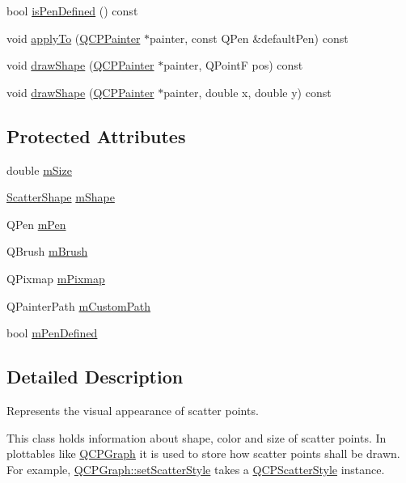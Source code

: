 \begin{DoxyCompactItemize}
bool \hyperlink{class_q_c_p_scatter_style_a7f1385a8d5e4f349a6b8030723fbd0f7}{is\+Pen\+Defined} () const 
\item 
void \hyperlink{class_q_c_p_scatter_style_a81817dfd404635f211e6ff2a04657d36}{apply\+To} (\hyperlink{class_q_c_p_painter}{Q\+C\+P\+Painter} $\ast$painter, const Q\+Pen \&default\+Pen) const 
\item 
void \hyperlink{class_q_c_p_scatter_style_a992d531ac471ec2b29bdec6aeb400a06}{draw\+Shape} (\hyperlink{class_q_c_p_painter}{Q\+C\+P\+Painter} $\ast$painter, Q\+Point\+F pos) const 
\item 
void \hyperlink{class_q_c_p_scatter_style_ae76811ac9f70ebf7a2b4c759853e6ed8}{draw\+Shape} (\hyperlink{class_q_c_p_painter}{Q\+C\+P\+Painter} $\ast$painter, double x, double y) const 
\end{DoxyCompactItemize}
\subsection*{Protected Attributes}
\begin{DoxyCompactItemize}
\item 
double \hyperlink{class_q_c_p_scatter_style_a757da98671eb06b221979373ac2cec91}{m\+Size}
\item 
\hyperlink{class_q_c_p_scatter_style_adb31525af6b680e6f1b7472e43859349}{Scatter\+Shape} \hyperlink{class_q_c_p_scatter_style_af1b327f35f107ed108290187bbc8c7c6}{m\+Shape}
\item 
Q\+Pen \hyperlink{class_q_c_p_scatter_style_a0f6a85e6d1e3ae1ca1b6efb4d4cdfe17}{m\+Pen}
\item 
Q\+Brush \hyperlink{class_q_c_p_scatter_style_a1b9c6ab10aebcaf236f1f45d1d6d64d1}{m\+Brush}
\item 
Q\+Pixmap \hyperlink{class_q_c_p_scatter_style_a7697346c89b19d4cd1d8dd33319ec9e3}{m\+Pixmap}
\item 
Q\+Painter\+Path \hyperlink{class_q_c_p_scatter_style_a813cb074744dc5a2f59cc99d6a10c6f0}{m\+Custom\+Path}
\item 
bool \hyperlink{class_q_c_p_scatter_style_a84ef5aa591ddba07b440f597e1669e78}{m\+Pen\+Defined}
\end{DoxyCompactItemize}


\subsection{Detailed Description}
Represents the visual appearance of scatter points. 

This class holds information about shape, color and size of scatter points. In plottables like \hyperlink{class_q_c_p_graph}{Q\+C\+P\+Graph} it is used to store how scatter points shall be drawn. For example, \hyperlink{class_q_c_p_graph_a12bd17a8ba21983163ec5d8f42a9fea5}{Q\+C\+P\+Graph\+::set\+Scatter\+Style} takes a \hyperlink{class_q_c_p_scatter_style}{Q\+C\+P\+Scatter\+Style} instance.

